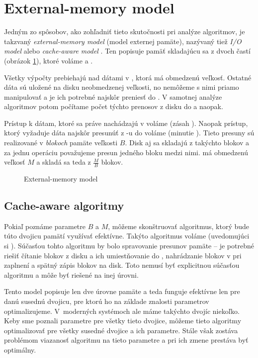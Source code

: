 \section{External-memory model} \label{sec:extmem}
Jedným zo spôsobov, ako zohľadniť tieto skutočnosti pri analýze algoritmov, je takzvaný \emph{external-memory model} (model externej pamäte), nazývaný tiež \emph{I/O model} alebo \emph{cache-aware model} \citep{aggarwal1988input}. Ten popisuje pamäť skladajúcu sa z dvoch častí (obrázok \ref{fig:exmem_model}), ktoré voláme \cache a \disk.

Všetky výpočty prebiehajú nad dátami v \cache, ktorá má obmedzenú veľkosť. Ostatné dáta sú uložené na disku neobmedzenej veľkosti, no nemôžeme s nimi priamo manipulovať a je ich potrebné najskôr preniesť do \cache. V samotnej analýze algoritmov potom počítame počet týchto prenosov z disku do \cache a naopak.

Prístup k dátam, ktoré sa práve nachádzajú v \cache voláme \hit (zásah \cache). Naopak prístup, ktorý vyžaduje dáta najskôr presunúť z \disk-u do \cache voláme \miss (minutie \cache). Tieto presuny sú realizované v \emph{blokoch} pamäte veľkosti $B$. Disk aj \cache sa skladajú z takýchto blokov a za jednu operáciu považujeme presun jedného bloku medzi nimi. \Cache má obmedzenú veľkosť $M$ a skladá sa teda z $\frac{M}{B}$ blokov.  

\begin{figure}
    \centering
    \resizebox{0.8\textwidth}{!}{%
            
    }
    \caption{External-memory model}
    \label{fig:exmem_model}
\end{figure}

\subsection{Cache-aware algoritmy}
Pokiaľ poznáme parametre $B$ a $M$, môžeme skonštruovať algoritmus, ktorý bude túto dvojicu pamätí využívať efektívne. Takýto algoritmus voláme \aware (uvedomujúci si \cache). Súčasťou tohto algoritmu by bolo spravovanie presunov pamäte -- je potrebné riešiť čítanie blokov z disku a ich umiestňovanie do \cache, nahrádzanie blokov v \cache pri zaplnení a spätný zápis blokov na disk. Toto nemusí byť explicitnou súčasťou algoritmu a môže byť riešené na inej úrovni.


Tento model popisuje len dve úrovne pamäte a teda funguje efektívne len pre danú susednú dvojicu, pre ktorú ho na základe znalosti parametrov optimalizujeme. V~moderných systémoch ale máme takýchto dvojíc niekoľko. Keby sme poznali parametre pre všetky tieto dvojice, môžeme tieto algoritmy optimalizovať pre všetky susedné dvojice a ich parametre. Stále však zostáva problémom viazanosť algoritmu na tieto parametre a pri ich zmene prestáva byť optimálny.


